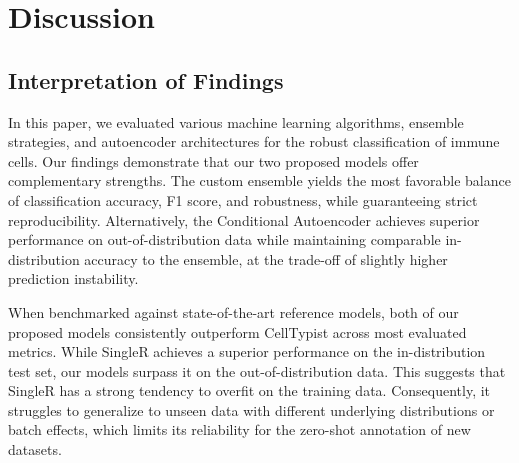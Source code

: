 \documentclass[11pt]{article}
\begin{document}
\FloatBarrier
\section{Discussion}\label{sec:discussion}



\subsection{Interpretation of Findings}\label{sec:discussion:interpretation}

In this paper, we evaluated various machine learning algorithms, ensemble strategies, and autoencoder architectures for the robust classification of immune cells. Our findings demonstrate that our two proposed models offer complementary strengths. The custom ensemble yields the most favorable balance of classification accuracy, F1 score, and robustness, while guaranteeing strict reproducibility. Alternatively, the Conditional Autoencoder achieves superior performance on out-of-distribution data while maintaining comparable in-distribution accuracy to the ensemble, at the trade-off of slightly higher prediction instability.


When benchmarked against state-of-the-art reference models, both of our proposed models consistently outperform CellTypist across most evaluated metrics. While SingleR achieves a superior performance on the in-distribution test set, our models surpass it on the out-of-distribution data. This suggests that SingleR has a strong tendency to overfit on the training data. Consequently, it struggles to generalize to unseen data with different underlying distributions or batch effects, which limits its reliability for the zero-shot annotation of new datasets.
\end{document}
